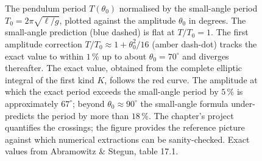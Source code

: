 \begin{figure}[htbp]
\caption[Pendulum period as a function of amplitude]{The pendulum
period $T(\theta_{0})$ normalised by the small-angle period
$T_{0}=2\pi\sqrt{\ell/g}$, plotted against the amplitude
$\theta_{0}$ in degrees. The small-angle prediction (blue dashed)
is flat at $T/T_{0}=1$. The first amplitude correction
$T/T_{0}\approx 1+\theta_{0}^{2}/16$ (amber dash-dot) tracks the
exact value to within $1\,\%$ up to about $\theta_{0}=70^{\circ}$
and diverges thereafter. The exact value, obtained from the
complete elliptic integral of the first kind $K$, follows the red
curve. The amplitude at which the exact period exceeds the
small-angle period by $5\,\%$ is approximately $67^{\circ}$;
beyond $\theta_{0}\approx 90^{\circ}$ the small-angle formula
under-predicts the period by more than $18\,\%$. The chapter's
project quantifies the crossings; the figure provides the
reference picture against which numerical extractions can be
sanity-checked. Exact values from Abramowitz \& Stegun, table 17.1.}
\label{fig:vol02:ch07:pendulum-period}
\end{figure}
